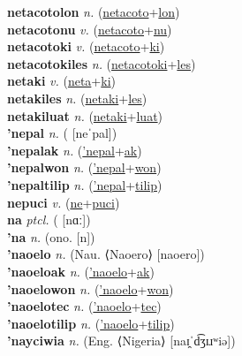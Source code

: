 \textbf{netacotolon} \textit{n.} (\hyperref[netacoto]{netacoto}+\hyperref[lon]{lon})
 \label{netacotolon} \\
\textbf{netacotonu} \textit{v.} (\hyperref[netacoto]{netacoto}+\hyperref[nu]{nu})
 \label{netacotonu} \\
\textbf{netacotoki} \textit{v.} (\hyperref[netacoto]{netacoto}+\hyperref[ki]{ki})
 \label{netacotoki} \\
\textbf{netacotokiles} \textit{n.} (\hyperref[netacotoki]{netacotoki}+\hyperref[les]{les})
 \label{netacotokiles} \\
\textbf{netaki} \textit{v.} (\hyperref[neta]{neta}+\hyperref[ki]{ki})
 \label{netaki} \\
\textbf{netakiles} \textit{n.} (\hyperref[netaki]{netaki}+\hyperref[les]{les})
 \label{netakiles} \\
\textbf{netakiluat} \textit{n.} (\hyperref[netaki]{netaki}+\hyperref[luat]{luat})
 \label{netakiluat} \\
\textbf{'nepal} \textit{n.} ( [neˈpal])
 \label{'nepal} \\
\textbf{'nepalak} \textit{n.} (\hyperref['nepal]{'nepal}+\hyperref[ak]{ak})
 \label{'nepalak} \\
\textbf{'nepalwon} \textit{n.} (\hyperref['nepal]{'nepal}+\hyperref[won]{won})
 \label{'nepalwon} \\
\textbf{'nepaltilip} \textit{n.} (\hyperref['nepal]{'nepal}+\hyperref[tilip]{tilip})
 \label{'nepaltilip} \\
\textbf{nepuci} \textit{v.} (\hyperref[ne]{ne}+\hyperref[puci]{puci})
 \label{nepuci} \\
\textbf{na} \textit{ptcl.} ( [nɑː])
 \label{na} \\
\textbf{'na} \textit{n.} (ono. [n])
 \label{'na} \\
\textbf{'naoelo} \textit{n.} (Nau. ⟨Naoero⟩ [naoero])
 \label{'naoelo} \\
\textbf{'naoeloak} \textit{n.} (\hyperref['naoelo]{'naoelo}+\hyperref[ak]{ak})
 \label{'naoeloak} \\
\textbf{'naoelowon} \textit{n.} (\hyperref['naoelo]{'naoelo}+\hyperref[won]{won})
 \label{'naoelowon} \\
\textbf{'naoelotec} \textit{n.} (\hyperref['naoelo]{'naoelo}+\hyperref[tec]{tec})
 \label{'naoelotec} \\
\textbf{'naoelotilip} \textit{n.} (\hyperref['naoelo]{'naoelo}+\hyperref[tilip]{tilip})
 \label{'naoelotilip} \\
\textbf{'nayciwia} \textit{n.} (Eng. ⟨Nigeria⟩ [naɪ̯ˈd͡ʒɪɹʷiə])
